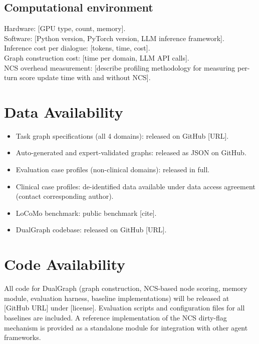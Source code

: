 \documentclass[11pt,a4paper]{article}
\newcommand{\placeholder}[1]{%
  \begin{tcolorbox}[colback=yellow!10,colframe=orange!60!black,
    fonttitle=\bfseries,title=Placeholder]
    #1
  \end{tcolorbox}%
}
\begin{document}
\subsection{Computational environment}
\label{sec:methods_compute}

\placeholder{%
  Hardware: [GPU type, count, memory].\\
  Software: [Python version, PyTorch version, LLM inference framework].\\
  Inference cost per dialogue: [tokens, time, cost].\\
  Graph construction cost: [time per domain, LLM API calls].\\
  NCS overhead measurement: [describe profiling methodology for measuring
  per-turn score update time with and without NCS].
}


\section*{Data Availability}

\placeholder{%
  \begin{itemize}[noitemsep]
    \item Task graph specifications (all 4 domains): released on GitHub
          [URL].
    \item Auto-generated and expert-validated graphs: released as JSON on
          GitHub.
    \item Evaluation case profiles (non-clinical domains): released in full.
    \item Clinical case profiles: de-identified data available under data
          access agreement (contact corresponding author).
    \item LoCoMo benchmark: public benchmark [cite].
    \item DualGraph codebase: released on GitHub [URL].
  \end{itemize}
}

\section*{Code Availability}

\placeholder{%
  All code for DualGraph (graph construction, NCS-based node scoring,
  memory module, evaluation harness, baseline implementations) will be
  released at [GitHub URL] under [license]. Evaluation scripts and
  configuration files for all baselines are included. A reference
  implementation of the NCS dirty-flag mechanism is provided as a
  standalone module for integration with other agent frameworks.
}
\end{document}
